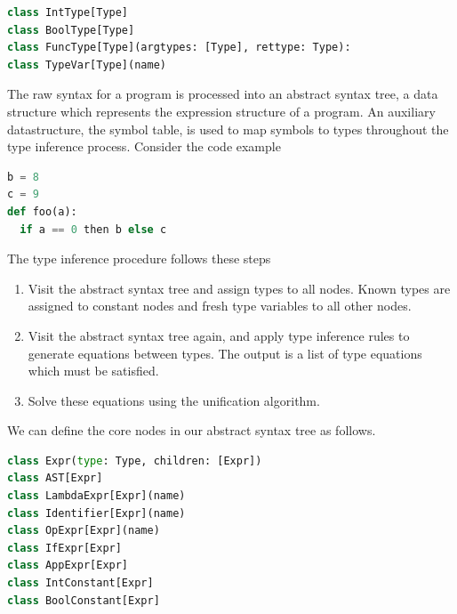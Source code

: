 \documentclass[book.tex]{subfiles}
\begin{document}
\begin{lstlisting}[language=python]
class IntType[Type]
class BoolType[Type]
class FuncType[Type](argtypes: [Type], rettype: Type):
class TypeVar[Type](name)
\end{lstlisting}

The raw syntax for a program is processed into an abstract syntax tree, a data structure which represents the expression structure of a program. An auxiliary datastructure, the symbol table, is used to map symbols to types throughout the type inference process. Consider the code example
\begin{lstlisting}[language=python]
b = 8
c = 9
def foo(a):
  if a == 0 then b else c
\end{lstlisting}

The type inference procedure follows these steps

\begin{enumerate}
\item Visit the abstract syntax tree and assign types to all nodes. Known types are assigned to constant nodes  
and fresh type variables to all other nodes. 
\item Visit the abstract syntax tree again, and apply type inference rules to generate equations between types. The output is a list of type equations which must be satisfied.
\item Solve these equations using the unification algorithm.
\end{enumerate}
We can define the core nodes in our abstract syntax tree as follows.
\begin{lstlisting}[language=python]
class Expr(type: Type, children: [Expr])
class AST[Expr]
class LambdaExpr[Expr](name)
class Identifier[Expr](name)
class OpExpr[Expr](name)
class IfExpr[Expr]
class AppExpr[Expr]
class IntConstant[Expr]
class BoolConstant[Expr]
\end{lstlisting}
\end{document}
